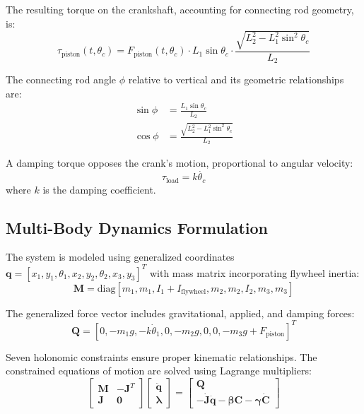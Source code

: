 \documentclass[10pt]{article}
\begin{document}
The resulting torque on the crankshaft, accounting for connecting rod geometry, is:
\begin{equation}
    \tau_{\text{piston}}(t, \theta_c) = F_{\text{piston}}(t, \theta_c) \cdot L_1 \sin\theta_c \cdot \frac{\sqrt{L_2^2 - L_1^2 \sin^2\theta_c}}{L_2}
\end{equation}

The connecting rod angle \(\phi\) relative to vertical and its geometric relationships are:
\begin{align}
    \sin\phi &= \frac{L_1 \sin\theta_c}{L_2} \\
    \cos\phi &= \frac{\sqrt{L_2^2 - L_1^2 \sin^2\theta_c}}{L_2}
\end{align}

A damping torque opposes the crank's motion, proportional to angular velocity:
\begin{equation}
    \tau_{\text{load}} = k \dot{\theta_c}
\end{equation}
where \(k\) is the damping coefficient.

\subsection{Multi-Body Dynamics Formulation}

The system is modeled using generalized coordinates \(\mathbf{q} = [x_1, y_1, \theta_1, x_2, y_2, \theta_2, x_3, y_3]^T\) with mass matrix incorporating flywheel inertia:
\begin{equation}
    \mathbf{M} = \text{diag}[m_1, m_1, I_1 + I_{\text{flywheel}}, m_2, m_2, I_2, m_3, m_3]
\end{equation}

The generalized force vector includes gravitational, applied, and damping forces:
\begin{equation}
    \mathbf{Q} = [0, -m_1g, -k\dot{\theta}_1, 0, -m_2g, 0, 0, -m_3g + F_{\text{piston}}]^T
\end{equation}

Seven holonomic constraints ensure proper kinematic relationships. The constrained equations of motion are solved using Lagrange multipliers:
\begin{equation}
    \begin{bmatrix}
        \mathbf{M} & -\mathbf{J}^T \\
        \mathbf{J} & \mathbf{0}
    \end{bmatrix}
    \begin{bmatrix}
        \ddot{\mathbf{q}} \\
        \boldsymbol{\lambda}
    \end{bmatrix} =
    \begin{bmatrix}
        \mathbf{Q} \\
        -\dot{\mathbf{J}}\dot{\mathbf{q}} - \boldsymbol{\beta}\mathbf{C} - \boldsymbol{\gamma}\dot{\mathbf{C}}
    \end{bmatrix}
\end{equation}
\end{document}
